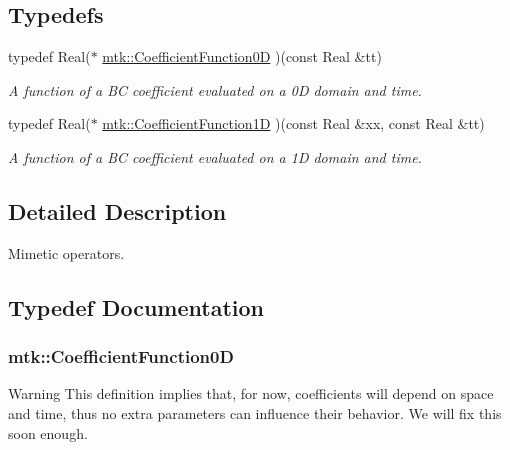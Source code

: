 \subsection*{Typedefs}
\begin{DoxyCompactItemize}
\item 
typedef Real($\ast$ \hyperlink{group__c07-mim__ops_ga04276745b4d511f0f3c636d6e0df7c2d}{mtk\+::\+Coefficient\+Function0\+D} )(const Real \&tt)
\begin{DoxyCompactList}\small\item\em A function of a B\+C coefficient evaluated on a 0\+D domain and time. \end{DoxyCompactList}\item 
typedef Real($\ast$ \hyperlink{group__c07-mim__ops_gaa79593eeb6676d6011db339e01983909}{mtk\+::\+Coefficient\+Function1\+D} )(const Real \&xx, const Real \&tt)
\begin{DoxyCompactList}\small\item\em A function of a B\+C coefficient evaluated on a 1\+D domain and time. \end{DoxyCompactList}\end{DoxyCompactItemize}


\subsection{Detailed Description}
Mimetic operators. 

\subsection{Typedef Documentation}
\hypertarget{group__c07-mim__ops_ga04276745b4d511f0f3c636d6e0df7c2d}{
\subsubsection[{Coefficient\+Function0\+D}]{\setlength{\rightskip}{0pt plus 5cm}mtk\+::\+Coefficient\+Function0\+D}}\label{group__c07-mim__ops_ga04276745b4d511f0f3c636d6e0df7c2d}
\begin{DoxyWarning}{Warning}
This definition implies that, for now, coefficients will depend on space and time, thus no extra parameters can influence their behavior. We will fix this soon enough. 
\end{DoxyWarning}


